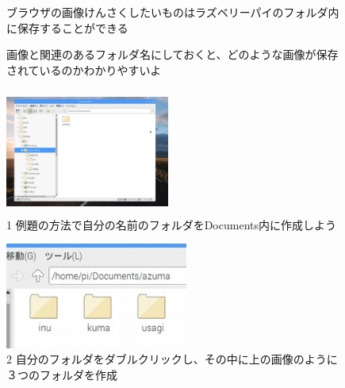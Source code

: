 \documentclass[a4paper,12pt]{jarticle}
\begin{document}
\begin{figure}[t]
  ブラウザの画像けんさくしたいものはラズベリーパイのフォルダ内に保存することができる

  画像と関連のあるフォルダ名にしておくと、どのような画像が保存されているのかわかりやすいよ



  \begin{minipage}{\textwidth}
    \begin{minipage}{6.582cm}
      \includegraphics[width=5.401cm,height=4.152cm]{textbook-img093.png}\\
      1 例題の方法で自分の名前のフォルダをDocuments内に作成しよう
    \end{minipage}
    \begin{minipage}{3.582cm}
    \end{minipage}
    \begin{minipage}{6.582cm}
      \includegraphics[width=5.995cm,height=3.475cm]{textbook-img094.jpg}\\
      2 自分のフォルダをダブルクリックし、その中に上の画像のように３つのフォルダを作成
    \end{minipage}
  \end{minipage}



\end{figure}
\end{document}
